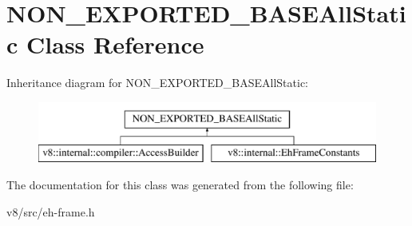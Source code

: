 \hypertarget{classNON__EXPORTED__BASEAllStatic}{}\section{N\+O\+N\+\_\+\+E\+X\+P\+O\+R\+T\+E\+D\+\_\+\+B\+A\+S\+E\+All\+Static Class Reference}
\label{classNON__EXPORTED__BASEAllStatic}
Inheritance diagram for N\+O\+N\+\_\+\+E\+X\+P\+O\+R\+T\+E\+D\+\_\+\+B\+A\+S\+E\+All\+Static\+:\begin{figure}[H]
\begin{center}
\leavevmode
\includegraphics[height=2.000000cm]{classNON__EXPORTED__BASEAllStatic}
\end{center}
\end{figure}


The documentation for this class was generated from the following file\+:\begin{DoxyCompactItemize}
\item 
v8/src/eh-\/frame.\+h\end{DoxyCompactItemize}
